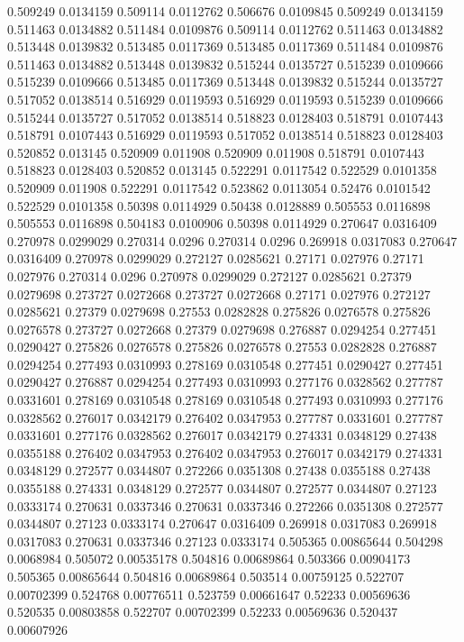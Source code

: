 0.509249 0.0134159
0.509114 0.0112762
0.506676 0.0109845
0.509249 0.0134159
0.511463 0.0134882
0.511484 0.0109876
0.509114 0.0112762
0.511463 0.0134882
0.513448 0.0139832
0.513485 0.0117369
0.513485 0.0117369
0.511484 0.0109876
0.511463 0.0134882
0.513448 0.0139832
0.515244 0.0135727
0.515239 0.0109666
0.515239 0.0109666
0.513485 0.0117369
0.513448 0.0139832
0.515244 0.0135727
0.517052 0.0138514
0.516929 0.0119593
0.516929 0.0119593
0.515239 0.0109666
0.515244 0.0135727
0.517052 0.0138514
0.518823 0.0128403
0.518791 0.0107443
0.518791 0.0107443
0.516929 0.0119593
0.517052 0.0138514
0.518823 0.0128403
0.520852 0.013145
0.520909 0.011908
0.520909 0.011908
0.518791 0.0107443
0.518823 0.0128403
0.520852 0.013145
0.522291 0.0117542
0.522529 0.0101358
0.520909 0.011908
0.522291 0.0117542
0.523862 0.0113054
0.52476 0.0101542
0.522529 0.0101358
0.50398 0.0114929
0.50438 0.0128889
0.505553 0.0116898
0.505553 0.0116898
0.504183 0.0100906
0.50398 0.0114929
0.270647 0.0316409
0.270978 0.0299029
0.270314 0.0296
0.270314 0.0296
0.269918 0.0317083
0.270647 0.0316409
0.270978 0.0299029
0.272127 0.0285621
0.27171 0.027976
0.27171 0.027976
0.270314 0.0296
0.270978 0.0299029
0.272127 0.0285621
0.27379 0.0279698
0.273727 0.0272668
0.273727 0.0272668
0.27171 0.027976
0.272127 0.0285621
0.27379 0.0279698
0.27553 0.0282828
0.275826 0.0276578
0.275826 0.0276578
0.273727 0.0272668
0.27379 0.0279698
0.276887 0.0294254
0.277451 0.0290427
0.275826 0.0276578
0.275826 0.0276578
0.27553 0.0282828
0.276887 0.0294254
0.277493 0.0310993
0.278169 0.0310548
0.277451 0.0290427
0.277451 0.0290427
0.276887 0.0294254
0.277493 0.0310993
0.277176 0.0328562
0.277787 0.0331601
0.278169 0.0310548
0.278169 0.0310548
0.277493 0.0310993
0.277176 0.0328562
0.276017 0.0342179
0.276402 0.0347953
0.277787 0.0331601
0.277787 0.0331601
0.277176 0.0328562
0.276017 0.0342179
0.274331 0.0348129
0.27438 0.0355188
0.276402 0.0347953
0.276402 0.0347953
0.276017 0.0342179
0.274331 0.0348129
0.272577 0.0344807
0.272266 0.0351308
0.27438 0.0355188
0.27438 0.0355188
0.274331 0.0348129
0.272577 0.0344807
0.272577 0.0344807
0.27123 0.0333174
0.270631 0.0337346
0.270631 0.0337346
0.272266 0.0351308
0.272577 0.0344807
0.27123 0.0333174
0.270647 0.0316409
0.269918 0.0317083
0.269918 0.0317083
0.270631 0.0337346
0.27123 0.0333174
0.505365 0.00865644
0.504298 0.0068984
0.505072 0.00535178
0.504816 0.00689864
0.503366 0.00904173
0.505365 0.00865644
0.504816 0.00689864
0.503514 0.00759125
0.522707 0.00702399
0.524768 0.00776511
0.523759 0.00661647
0.52233 0.00569636
0.520535 0.00803858
0.522707 0.00702399
0.52233 0.00569636
0.520437 0.00607926
